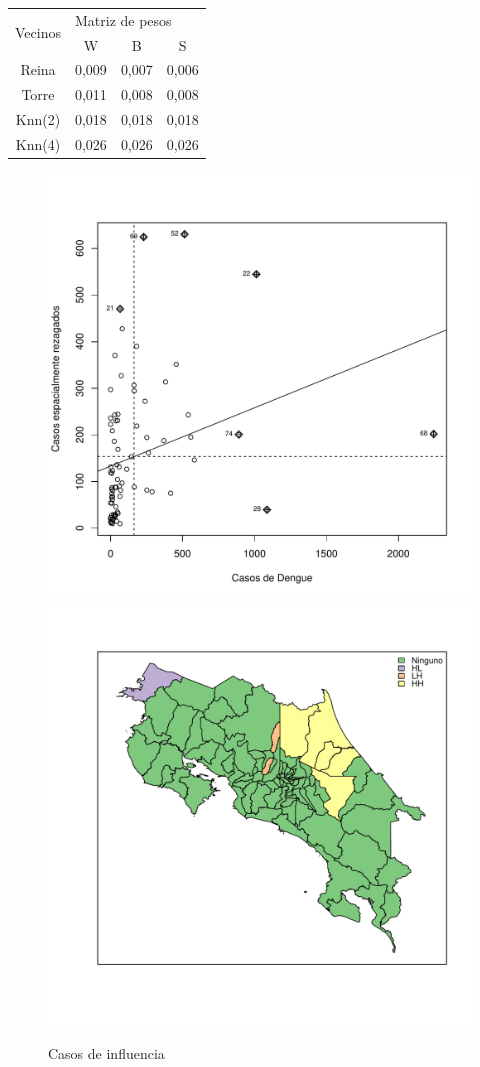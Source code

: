 \documentclass[12pt,a4paper]{article}
\begin{document}
\begin{table}[h]
\centering
\begin{tabular}{cccc}
\hline
\multirow{2}{*}{Vecinos} & \multicolumn{3}{l}{Matriz de pesos}\\ \cline{2-4} 
&W&B&S\\ \hline
Reina&0,009&0,007&0,006\\
Torre&0,011&0,008&0,008\\
Knn(2)&0,018&0,018&0,018\\
Knn(4)&0,026&0,026&0,026\\ \hline
\end{tabular}
\end{table}

\begin{figure}[hbtp]
\centering
\includegraphics[width=.48\textwidth]{F31.pdf}
\includegraphics[width=.48\textwidth]{F32.pdf}
\caption{Casos de influencia}
\end{figure}
\end{document}
